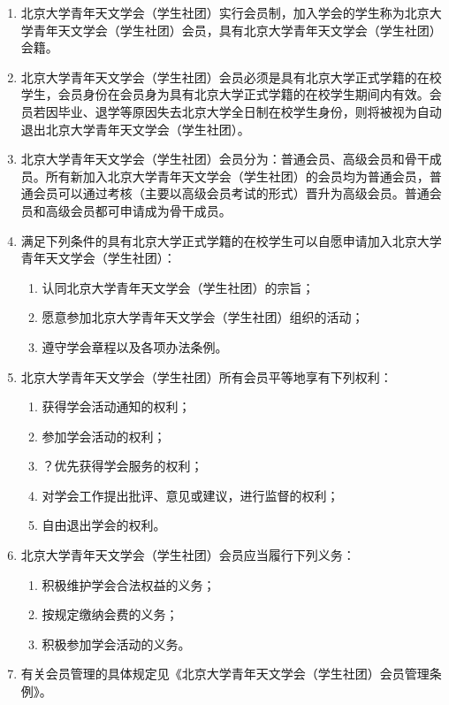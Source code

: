 \begin{enumerate}[resume]
    \item 北京大学青年天文学会（学生社团）实行会员制，加入学会的学生称为北京大学青年天文学会（学生社团）会员，具有北京大学青年天文学会（学生社团）会籍。
    
    \item 北京大学青年天文学会（学生社团）会员必须是具有北京大学正式学籍的在校学生，会员身份在会员身为具有北京大学正式学籍的在校学生期间内有效。会员若因毕业、退学等原因失去北京大学全日制在校学生身份，则将被视为自动退出北京大学青年天文学会（学生社团）。
    
    \item 北京大学青年天文学会（学生社团）会员分为：普通会员、高级会员和骨干成员。所有新加入北京大学青年天文学会（学生社团）的会员均为普通会员，普通会员可以通过考核（主要以高级会员考试的形式）晋升为高级会员。普通会员和高级会员都可申请成为骨干成员。
    
    \item 满足下列条件的具有北京大学正式学籍的在校学生可以自愿申请加入北京大学青年天文学会（学生社团）：
    
    \begin{enumerate}
        \item 认同北京大学青年天文学会（学生社团）的宗旨；
        \item 愿意参加北京大学青年天文学会（学生社团）组织的活动；
        \item 遵守学会章程以及各项办法条例。
    \end{enumerate}
    
    \item 北京大学青年天文学会（学生社团）所有会员平等地享有下列权利：
    
    \begin{enumerate}
        \item 获得学会活动通知的权利；
        \item 参加学会活动的权利；
        \item ？优先获得学会服务的权利；
        \item 对学会工作提出批评、意见或建议，进行监督的权利；
        \item 自由退出学会的权利。
    \end{enumerate}
    
    \item 北京大学青年天文学会（学生社团）会员应当履行下列义务：
    
    \begin{enumerate}
        \item 积极维护学会合法权益的义务；
        \item 按规定缴纳会费的义务；
        \item 积极参加学会活动的义务。
    \end{enumerate}

    \item 有关会员管理的具体规定见《北京大学青年天文学会（学生社团）会员管理条例》。
    
\end{enumerate}

